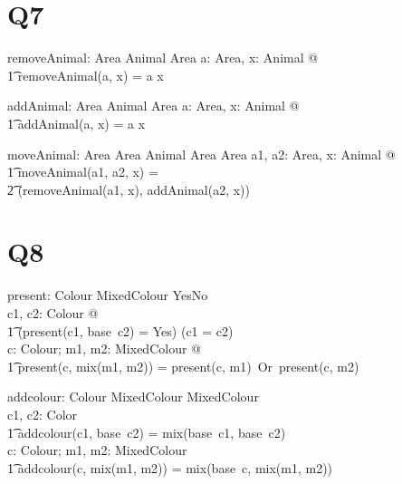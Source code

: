 \documentclass{article}
\begin{document}
\section*{Q7}

\begin{axdef}
	removeAnimal: Area \cross Animal \pfun Area
\where
	\forall a: Area, x: Animal @ \\
		\t1 removeAnimal(a, x) = a \uminus x
\end{axdef}


\begin{axdef} %
	addAnimal: Area \cross Animal \pfun Area
\where
	\forall a: Area, x: Animal @ \\
		\t1 addAnimal(a, x) = a \uplus x
\end{axdef}

	
\begin{axdef} %
	moveAnimal: Area \cross Area \cross Animal \pfun Area \cross Area
\where
\forall a1, a2: Area, x: Animal @ \\
	\t1 moveAnimal(a1, a2, x) = \\ \t2 (removeAnimal(a1, x), addAnimal(a2, x))
\end{axdef}

\section*{Q8}

\begin{axdef}
	present: Colour \cross MixedColour \fun YesNo \\
\where
\forall c1, c2: Colour @ \\
	\t1 (present(c1, base\ c2) = Yes) \iff (c1 = c2) \\
\forall c: Colour; m1, m2: MixedColour @ \\
	\t1 present(c, mix(m1, m2)) = present(c, m1)\ Or\ present(c, m2) \\
\end{axdef}

\begin{axdef}
	addcolour: Colour \cross MixedColour \fun MixedColour \\
\where
	\forall c1, c2: Color \\
		\t1 addcolour(c1, base\ c2) = mix(base\ c1, base\ c2) \\
	\forall c: Colour; m1, m2: MixedColour \\
		\t1 addcolour(c, mix(m1, m2)) = mix(base\ c, mix(m1, m2)) \\
 \end{axdef}
\end{document}
